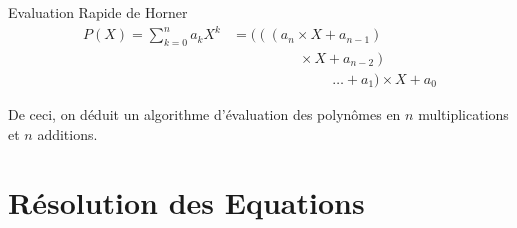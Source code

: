 \documentclass{cours}
\begin{document}
\begin{propositionfr}{Evaluation Rapide de Horner}{}
    \vspace{-18pt}
    \[\begin{split}
            P(X) = \sum_{k = 0}^{n}a_{k}X^{k} &= (\left(\left(a_{n} \times X + a_{n - 1}\right)\right.\\
            &\left.\hspace{2cm} \times X + a_{n - 2}\right)\\
            & \hspace{3cm} \ldots + a_{1})\times X + a_{0}
        \end{split}\]
\end{propositionfr}
De ceci, on déduit un algorithme d'évaluation des polynômes en $n$ multiplications et $n$ additions.

\section{Résolution des Equations}
\end{document}
